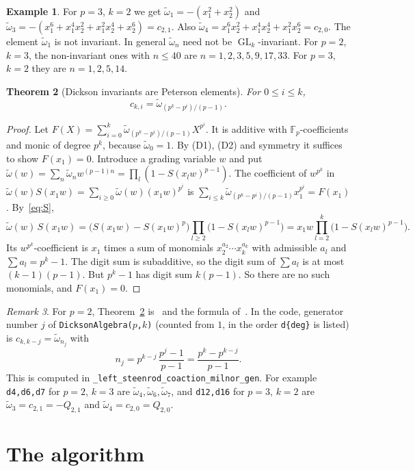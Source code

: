 \documentclass[11pt]{amsart}
\newtheorem{theorem}{Theorem}[section]
\theoremstyle{definition}
\newtheorem{example}[theorem]{Example}
\theoremstyle{remark}
\newtheorem{remark}[theorem]{Remark}
\newcommand{\F}{\mathbb{F}_p}
\newcommand{\wt}{\widetilde{\omega}}
\newcommand{\code}[1]{\texttt{#1}}
\DeclareMathOperator{\GL}{GL}
\begin{document}
\begin{example}
For $p=3$, $k=2$ we get $\wt_1=-(x_1^2+x_2^2)$ and
$\wt_3=-(x_1^6+x_1^4x_2^2+x_1^2x_2^4+x_2^6)=c_{2,1}$.  Also
$\wt_4=x_1^6x_2^2+x_1^4x_2^4+x_1^2x_2^6=c_{2,0}$.  The element $\wt_1$ is
not invariant.  In general $\wt_n$ need not be $\GL_k$-invariant.  For $p=2$,
$k=3$, the non-invariant ones with $n\le 40$ are $n=1,2,3,5,9,17,33$.  For $p=3$,
$k=2$ they are $n=1,2,5,14$.
\end{example}

\begin{theorem}[Dickson invariants are Peterson elements]\label{thm:A}
For $0\le i\le k$,
\[
  c_{k,i}=\wt_{(p^k-p^i)/(p-1)} .
\]
\end{theorem}

\begin{proof}
Let $F(X)=\sum_{i=0}^k\wt_{(p^k-p^i)/(p-1)}X^{p^i}$.  It is additive with
$\F$-coefficients and monic of degree $p^k$, because $\wt_0=1$.  By (D1), (D2)
and symmetry it suffices to show $F(x_1)=0$.  Introduce a grading variable
$w$ and put $\wt(w)=\sum_n\wt_nw^{(p-1)n}=\prod_l(1-S(x_lw)^{p-1})$.  The
coefficient of $w^{p^k}$ in $\wt(w)S(x_1w)=\sum_{i\ge0}\wt(w)(x_1w)^{p^i}$
is $\sum_{i\le k}\wt_{(p^k-p^i)/(p-1)}x_1^{p^i}=F(x_1)$.  By~\eqref{eq:S},
\[
  \wt(w)\,S(x_1w)=\bigl(S(x_1w)-S(x_1w)^p\bigr)\prod_{l\ge2}\bigl(1-S(x_lw)^{p-1}\bigr)
  = x_1w\prod_{l=2}^k\bigl(1-S(x_lw)^{p-1}\bigr).
\]
Its $w^{p^k}$-coefficient is $x_1$ times a sum of monomials
$x_2^{a_2}\cdots x_k^{a_k}$ with admissible $a_l$ and $\sum a_l=p^k-1$.  The
digit sum is subadditive, so the digit sum of $\sum a_l$ is at most
$(k-1)(p-1)$.  But $p^k-1$ has digit sum $k(p-1)$.  So there are no such
monomials, and $F(x_1)=0$.
\end{proof}

\begin{remark}
For $p=2$, Theorem~\ref{thm:A} is~\cite[Prop.~3.6(c)]{Arnon} and the formula
of~\cite[\S2]{HungPeterson98}.
In the code, generator number $j$ of \code{DicksonAlgebra($p$,$k$)} (counted
from $1$, in the order \code{d\{deg\}} is listed) is $c_{k,k-j}=\wt_{n_j}$ with
\[
  n_j=p^{k-j}\,\frac{p^j-1}{p-1}=\frac{p^k-p^{k-j}}{p-1}.
\]
This is computed in \code{\_left\_steenrod\_coaction\_milnor\_gen}.  For example
\code{d4,d6,d7} for $p=2$, $k=3$ are $\wt_4,\wt_6,\wt_7$, and \code{d12,d16} for
$p=3$, $k=2$ are $\wt_3=c_{2,1}=-Q_{2,1}$ and $\wt_4=c_{2,0}=Q_{2,0}$.
\end{remark}

\section{The algorithm}\label{sec:algorithm}
\end{document}
